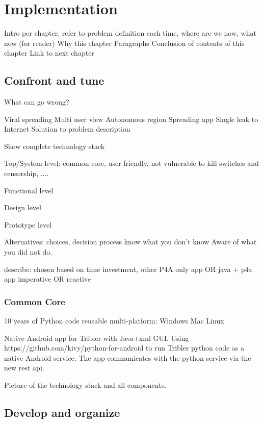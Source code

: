 \chapter{Implementation}


Intro per chapter, refer to problem definition each time, where are we now, what now (for reader)
Why this chapter
Paragraphs
Conclusion of contents of this chapter
Link to next chapter




\section{Confront and tune} %

What can go wrong?



Viral spreading
Multi user view
Autonomous region
Spreading app
Single leak to Internet
Solution to problem description


Show complete technology stack




Top/System level: common core, user friendly, not vulnerable to kill switches and censorship, ....


Functional level

Design level

Prototype level



Alternatives: choices, decision process
know what you don't know
Aware of what you did not do.


describe: chosen based on time investment, other 
P4A only app OR java + p4a app
imperative OR reactive



\subsection{Common Core}
10 years of Python code 
reusable multi-platform: Windows Mac Linux


Native Android app for Tribler with Java+xml GUI.
Using https://github.com/kivy/python-for-android to run Tribler python code as a native Android service.
The app communicates with the python service via the new rest api.

Picture of the technology stack and all components.


\section{Develop and organize} %



